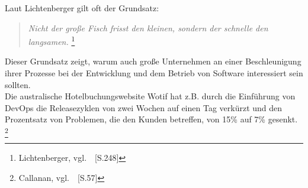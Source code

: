 Laut Lichtenberger gilt oft der Grundsatz:

\begin{quotation}
    \textsl{Nicht der große Fisch frisst den kleinen, sondern der schnelle den langsamen.}
    \footnote{Lichtenberger, vgl.~\cite{Lichtenberger2017}~[S.248]}
\end{quotation}

Dieser Grundsatz zeigt, warum auch große Unternehmen an einer Beschleunigung ihrer Prozesse bei der Entwicklung und dem Betrieb von Software interessiert sein sollten. \\

Die australische Hotelbuchungswebsite Wotif hat z.B. durch die Einführung von DevOps die Releasezyklen von zwei Wochen auf einen Tag verkürzt und den Prozentsatz von Problemen,
die den Kunden betreffen, von 15\% auf 7\% gesenkt.
\footnote{Callanan, vgl.~\cite{Callanan2016}~[S.57]}


